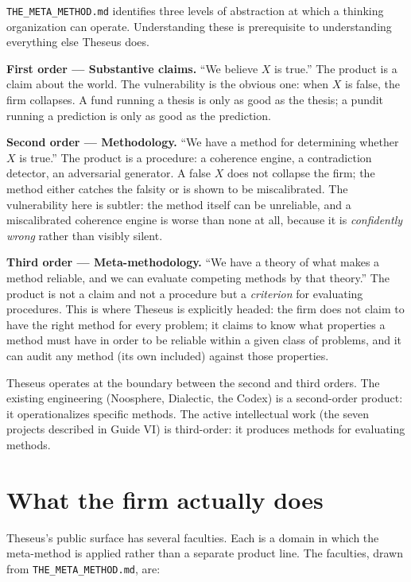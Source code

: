 \documentclass[11pt,letterpaper]{article}
\newcommand{\file}[1]{\texttt{#1}}
\begin{document}
\file{THE\_META\_METHOD.md} identifies three levels of abstraction at which a thinking organization can operate. Understanding these is prerequisite to understanding everything else Theseus does.

\textbf{First order --- Substantive claims.} ``We believe $X$ is true.'' The product is a claim about the world. The vulnerability is the obvious one: when $X$ is false, the firm collapses. A fund running a thesis is only as good as the thesis; a pundit running a prediction is only as good as the prediction.

\textbf{Second order --- Methodology.} ``We have a method for determining whether $X$ is true.'' The product is a procedure: a coherence engine, a contradiction detector, an adversarial generator. A false $X$ does not collapse the firm; the method either catches the falsity or is shown to be miscalibrated. The vulnerability here is subtler: the method itself can be unreliable, and a miscalibrated coherence engine is worse than none at all, because it is \emph{confidently wrong} rather than visibly silent.

\textbf{Third order --- Meta-methodology.} ``We have a theory of what makes a method reliable, and we can evaluate competing methods by that theory.'' The product is not a claim and not a procedure but a \emph{criterion} for evaluating procedures. This is where Theseus is explicitly headed: the firm does not claim to have the right method for every problem; it claims to know what properties a method must have in order to be reliable within a given class of problems, and it can audit any method (its own included) against those properties.

Theseus operates at the boundary between the second and third orders. The existing engineering (Noosphere, Dialectic, the Codex) is a second-order product: it operationalizes specific methods. The active intellectual work (the seven projects described in Guide VI) is third-order: it produces methods for evaluating methods.

\section{What the firm actually does}

Theseus's public surface has several faculties. Each is a domain in which the meta-method is applied rather than a separate product line. The faculties, drawn from \file{THE\_META\_METHOD.md}, are:
\end{document}
